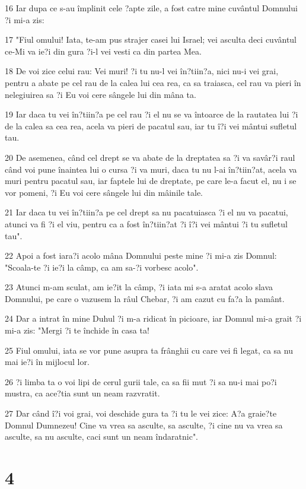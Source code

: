 \par 16 Iar dupa ce s-au împlinit cele ?apte zile, a fost catre mine cuvântul Domnului ?i mi-a zis:
\par 17 "Fiul omului! Iata, te-am pus strajer casei lui Israel; vei asculta deci cuvântul ce-Mi va ie?i din gura ?i-l vei vesti ca din partea Mea.
\par 18 De voi zice celui rau: Vei muri! ?i tu nu-l vei în?tiin?a, nici nu-i vei grai, pentru a abate pe cel rau de la calea lui cea rea, ca sa traiasca, cel rau va pieri în nelegiuirea sa ?i Eu voi cere sângele lui din mâna ta.
\par 19 Iar daca tu vei în?tiin?a pe cel rau ?i el nu se va întoarce de la rautatea lui ?i de la calea sa cea rea, acela va pieri de pacatul sau, iar tu î?i vei mântui sufletul tau.
\par 20 De asemenea, când cel drept se va abate de la dreptatea sa ?i va savâr?i raul când voi pune înaintea lui o cursa ?i va muri, daca tu nu l-ai în?tiin?at, acela va muri pentru pacatul sau, iar faptele lui de dreptate, pe care le-a facut el, nu i se vor pomeni, ?i Eu voi cere sângele lui din mâinile tale.
\par 21 Iar daca tu vei în?tiin?a pe cel drept sa nu pacatuiasca ?i el nu va pacatui, atunci va fi ?i el viu, pentru ca a fost în?tiin?at ?i î?i vei mântui ?i tu sufletul tau".
\par 22 Apoi a fost iara?i acolo mâna Domnului peste mine ?i mi-a zis Domnul: "Scoala-te ?i ie?i la câmp, ca am sa-?i vorbesc acolo".
\par 23 Atunci m-am sculat, am ie?it la câmp, ?i iata mi s-a aratat acolo slava Domnului, pe care o vazusem la râul Chebar, ?i am cazut cu fa?a la pamânt.
\par 24 Dar a intrat în mine Duhul ?i m-a ridicat în picioare, iar Domnul mi-a grait ?i mi-a zis: "Mergi ?i te închide în casa ta!
\par 25 Fiul omului, iata se vor pune asupra ta frânghii cu care vei fi legat, ca sa nu mai ie?i în mijlocul lor.
\par 26 ?i limba ta o voi lipi de cerul gurii tale, ca sa fii mut ?i sa nu-i mai po?i mustra, ca ace?tia sunt un neam razvratit.
\par 27 Dar când î?i voi grai, voi deschide gura ta ?i tu le vei zice: A?a graie?te Domnul Dumnezeu! Cine va vrea sa asculte, sa asculte, ?i cine nu va vrea sa asculte, sa nu asculte, caci sunt un neam îndaratnic".

\chapter{4}

